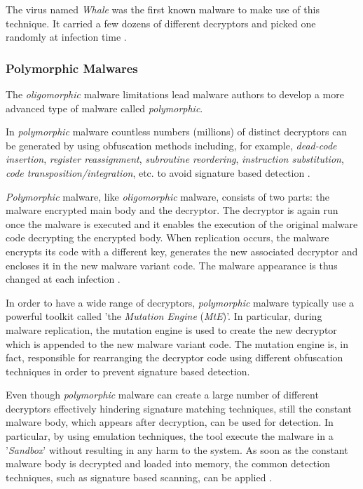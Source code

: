 \documentclass[pdfa%
,cucitura%
]{toptesi}
\begin{document}
The virus named \textit{Whale} was the first known malware to make use of this technique. It carried a few dozens of different decryptors and picked one randomly at infection time \cite{NamanyaTWM}.

\subsubsection{Polymorphic Malwares}
The \textit{oligomorphic} malware limitations lead malware authors to develop a more advanced type of malware called \textit{polymorphic}.

In \textit{polymorphic} malware countless numbers (millions) of distinct decryptors can be generated by using obfuscation methods including, for example, \textit{dead-code insertion}, \textit{register reassignment}, \textit{subroutine reordering}, \textit{instruction substitution}, \textit{code transposition/integration}, etc. to avoid signature based detection \cite{YouMOT}.

\textit{Polymorphic} malware, like \textit{oligomorphic} malware, consists of two parts: the malware encrypted main body and the decryptor. The decryptor is again run once the malware is executed and it enables the execution of the original malware code decrypting the encrypted body. When replication occurs, the malware encrypts its code with a different key, generates the new associated decryptor and encloses it in the new malware variant code. The malware appearance is thus changed at each infection \cite{Sharma_2014}.

In order to have a wide range of decryptors, \textit{polymorphic} malware typically use a powerful toolkit called 'the \textit{Mutation Engine} (\textit{MtE})'. In particular, during malware replication, the mutation engine is used to create the new decryptor which is appended to the new malware variant code. The mutation engine is, in fact, responsible for rearranging the decryptor code using different obfuscation techniques in order to prevent signature based detection.

Even though \textit{polymorphic} malware can create a large number of different decryptors effectively hindering signature matching techniques, still the constant malware body, which appears after decryption, can be used for detection. In particular, by using emulation techniques, the tool execute the malware in a '\textit{Sandbox}' without resulting in any harm to the system. As soon as the constant malware body is decrypted and loaded into memory, the common detection techniques, such as signature based scanning, can be applied \cite{NamanyaTWM}.
\end{document}
